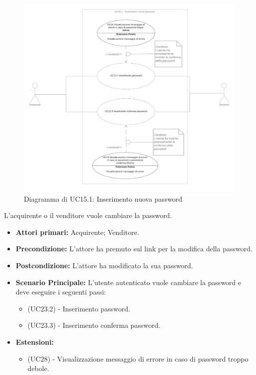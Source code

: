 \begin{figure}[H]
    \centering
    \includegraphics[width=\textwidth]{Immagini/DiagrammiUC/UC15.1InserimentoNuovaPassword}
    \caption{Diagramma di UC15.1: Inserimento nuova password} 
    \label{fig:VisualizzazioneProdottiNelCarrello}
\end{figure}

L'acquirente o il venditore vuole cambiare la password.
\begin{itemize}
    \item \textbf{Attori primari:} Acquirente; Venditore.
    \item \textbf{Precondizione:} L'attore ha premuto sul link per la modifica della password.
    \item \textbf{Postcondizione:} L'attore ha modificato la sua password.
    \item \textbf{Scenario Principale:} L'utente autenticato vuole cambiare la password e deve eseguire i seguenti passi:
    \begin{itemize}
        \item (UC23.2) - Inserimento password.
        \item (UC23.3) - Inserimento conferma password.
    \end{itemize}
    \item \textbf{Estensioni:}
    \begin{itemize}
        \item (UC28) - Visualizzazione messaggio di errore in caso di password troppo debole.
    \end{itemize}
\end{itemize}

